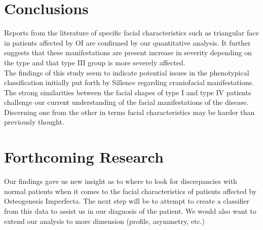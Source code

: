\documentclass[a0,portrait]{a0poster}
\begin{document}
\begin{multicols}{2}
\section{Conclusions}
Reports from the literature of specific facial characteristics such as
triangular face in patients affected by OI are confirmed by our quantitative
analysis.  It further suggests that these manifestations are present  increase
in  severity depending on the type and that  type III group is  more severely
affected.\\
The findings of this study seem to indicate potential issues in the
phenotypical classification initially put forth by Sillence regarding
craniofacial manifestations. The strong similarities between the facial shapes
of type I and type IV patients challenge our current understanding of the
facial manifestations of the disease. Discerning one from the other in terms
facial characteristics may be harder than previously thought.

\color{DarkSlateGray} %


\section{Forthcoming Research}
Our findings gave us new insight as to where to look for discrepancies with
normal patients when it comes to the facial characteristics of patients affected
by Osteogenesis Imperfecta. The next step will be to attempt to create a classifier from
this data to assist us in our diagnosis of the patient. We would also want to extend our analysis to
more dimension (profile, asymmetry, etc.)


\small
\printbibliography



\end{multicols}
\end{document}
